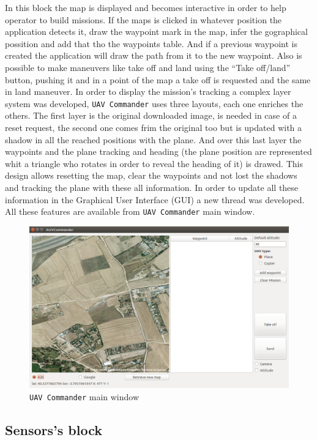 \documentclass{llncs}
\begin{document}
In this block the map is displayed and becomes interactive in order to help operator to build missions. If the maps is clicked in whatever position the application detects it, draw the waypoint mark in the map, infer the gographical possition and add that tho the waypoints table. And if a previous waypoint is created the application will draw the path from it to the new waypoint. Also is possible to make maneuvers like take off and land using the ``Take off/land'' button, pushing it and in a point of the map a take off is requested and the same in land maneuver.
In order to display the mission's tracking a complex layer system was developed, \texttt{UAV Commander} uses three layouts,  each one enriches the others. The first layer is the original downloaded image, is needed in case of a reset request, the second one comes frim the original too but is updated with a shadow in all the reached positions with the plane. And over this last layer the waypoints and the plane tracking and heading (the plane position are represented whit a triangle who rotates in order to reveal the heading of it) is drawed. This design allows resetting the map, clear the waypoints and not lost the shadows and tracking the plane with these all information.
In order to update all these information in the Graphical User Interface (GUI) a new thread was developed.
All these features are available from \texttt{UAV Commander} main window.

\begin{figure}
  \centering
  \includegraphics[scale=0.3]{img/uavc.png}
  \caption{\texttt{UAV Commander} main window}
  \label{fig:uavc_ppal}
\end{figure}

\subsection{Sensors's block}
\label{sensors_block}
\end{document}
